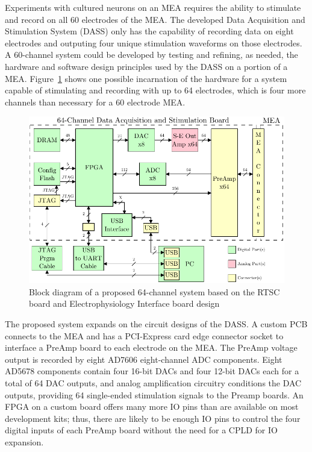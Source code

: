 Experiments with cultured neurons on an MEA requires the ability to stimulate and record on all 60 electrodes of the MEA.  The developed Data Acquisition and Stimulation System (DASS) only has the capability of recording data on eight electrodes and outputing four unique stimulation waveforms on those electrodes.  A 60-channel system could be developed by testing and refining, as needed, the hardware and software design principles used by the DASS on a portion of a MEA.  Figure~\ref{fig:System64} shows one possible incarnation of the hardware for a system capable of stimulating and recording with up to 64 electrodes, which is four more channels than necessary for a 60 electrode MEA.

\begin{figure}[htb]
	\begin{singlespace}
	\centering	
		\includegraphics{./figures/System64} 
	\caption{Block diagram of a proposed 64-channel system based on the RTSC board and Electrophysiology Interface board design\label{fig:System64}}
	\end{singlespace}
\end{figure}

The proposed system expands on the circuit designs of the DASS.  A custom PCB connects to the MEA and has a PCI-Express card edge connector socket to interface a PreAmp board to each electrode on the MEA.  The PreAmp voltage output is recorded by eight AD7606 eight-channel ADC components.  Eight AD5678 components contain four 16-bit DACs and four 12-bit DACs each for a total of 64 DAC outputs, and analog amplification circuitry conditions the DAC outputs, providing 64 single-ended stimulation signals to the Preamp boards.  An FPGA on a custom board offers many more IO pins than are available on most development kits; thus, there are likely to be enough IO pins to control the four digital inputs of each PreAmp board without the need for a CPLD for IO expansion.

